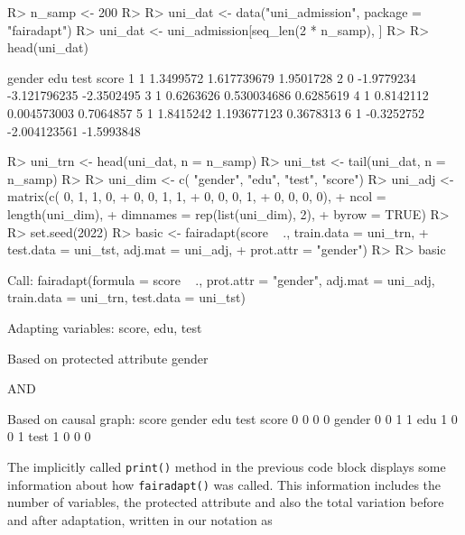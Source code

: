 \documentclass[
  nojss]{jss}
\begin{document}
\begin{CodeChunk}
\begin{CodeInput}
R> n_samp <- 200
R> 
R> uni_dat <- data("uni_admission", package = "fairadapt")
R> uni_dat <- uni_admission[seq_len(2 * n_samp), ]
R> 
R> head(uni_dat)
\end{CodeInput}
\begin{CodeOutput}
  gender        edu         test      score
1      1  1.3499572  1.617739679  1.9501728
2      0 -1.9779234 -3.121796235 -2.3502495
3      1  0.6263626  0.530034686  0.6285619
4      1  0.8142112  0.004573003  0.7064857
5      1  1.8415242  1.193677123  0.3678313
6      1 -0.3252752 -2.004123561 -1.5993848
\end{CodeOutput}
\begin{CodeInput}
R> uni_trn <- head(uni_dat, n = n_samp)
R> uni_tst <- tail(uni_dat, n = n_samp)
R> 
R> uni_dim <- c(       "gender", "edu", "test", "score")
R> uni_adj <- matrix(c(       0,     1,      1,       0,
+                             0,     0,      1,       1,
+                             0,     0,      0,       1,
+                             0,     0,      0,       0),
+                   ncol = length(uni_dim),
+                   dimnames = rep(list(uni_dim), 2),
+                   byrow = TRUE)
R> 
R> set.seed(2022)
R> basic <- fairadapt(score ~ ., train.data = uni_trn,
+                     test.data = uni_tst, adj.mat = uni_adj,
+                     prot.attr = "gender")
R> 
R> basic
\end{CodeInput}
\begin{CodeOutput}

Call:
fairadapt(formula = score ~ ., prot.attr = "gender", adj.mat = uni_adj, 
    train.data = uni_trn, test.data = uni_tst)


Adapting variables:
  score, edu, test

Based on protected attribute gender 

  AND

Based on causal graph:
       score gender edu test
score      0      0   0    0
gender     0      0   1    1
edu        1      0   0    1
test       1      0   0    0
\end{CodeOutput}
\end{CodeChunk}

The implicitly called \texttt{print()} method in the previous code block
displays some information about how \texttt{fairadapt()} was called.
This information includes the number of variables, the protected
attribute and also the total variation before and after adaptation,
written in our notation as
\end{document}
